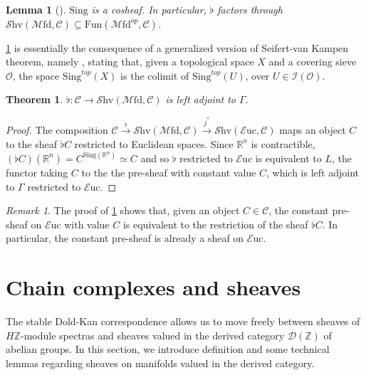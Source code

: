 \documentclass[10pt]{amsart}
\newcommand{\C}{\mathscr{C}}
\newcommand{\D}{\mathscr{D}}
\newcommand{\I}{\mathscr{I}}
\newcommand{\bR}{\mathbb{R}}
\newcommand{\bZ}{\mathbb{Z}}
\newcommand{\Fun}{\mathrm{Fun}}
\newcommand{\Euc}{\mathscr{E}\mathrm{uc}}
\newcommand{\Mfd}{\mathscr{M}\mathrm{fd}}
\newcommand{\Shv}{\mathscr{S}\mathrm{hv}}
\newcommand{\Sing}{\mathrm{Sing}}
\newtheorem{theorem}[equation]{Theorem}
\newtheorem{lemma}[equation]{Lemma}
\theoremstyle{definition}
\theoremstyle{remark}
\newtheorem{remark}[equation]{Remark}
\numberwithin{equation}{section}
\begin{document}
\begin{lemma}[{\cite[Corollary 6.46]{bunkegepner2021differential}}]\label{lem:flatsheaf}
  $\Sing$ is a cosheaf. In particular,
  $\flat$ factors through $\Shv(\Mfd,\C)\subseteq\Fun(\Mfd^{op},\C)$.
\end{lemma}
\cref{lem:flatsheaf} is essentially the consequence of a generalized version of Seifert-van Kampen theorem, namely \cite[Proposition A.3.2]{lurie2017ha}, stating that, given a topological space $X$ and a covering sieve $\mathscr{O}$, the space $\Sing^{top}(X)$ is the colimit of $\Sing^{top}(U)$, over $U\in\I(\mathscr{O})$.
\begin{theorem}\label{thm:leftadjoint}
  $\flat:\C\to\Shv(\Mfd,\C)$ is left adjoint to $\Gamma$.
\end{theorem}
\begin{proof}
  The composition $\C\xrightarrow{\flat}\Shv(\Mfd,\C)\xrightarrow{j^*}\Shv(\Euc,\C)$ maps an object $C$ to the sheaf $\flat C$ restricted to Euclidean spaces. Since $\bR^n$ is contractible, $(\flat C)(\bR^n)=C^{\Sing(\bR^n)}\simeq C$ and so $\flat$ restricted to $\Euc$ is equivalent to $L$, the functor taking $C$ to the the pre-sheaf with constant value $C$, which is left adjoint to $\Gamma$ restricted to $\Euc$.
\end{proof}
\begin{remark}\label{rmk:constsheaf}
  The proof of \cref{thm:leftadjoint} shows that, given an object $C\in\C$, the constant pre-sheaf on $\Euc$ with value $C$ is equivalent to the restriction of the sheaf $\flat C$. In particular, the constant pre-sheaf is already a sheaf on $\Euc$. 
\end{remark}

\section{Chain complexes and sheaves}

The stable Dold-Kan correspondence allows us to move freely between sheaves of $H\bZ$-module spectras and sheaves valued in the derived category $\D(\bZ)$ of abelian groups. In this section, we introduce definition and some technical lemmas regarding sheaves on manifolds valued in the derived category.  
\end{document}
